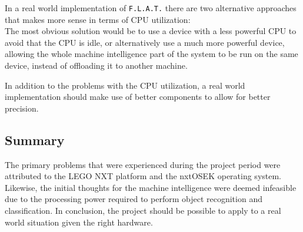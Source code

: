 In a real world implementation of \texttt{F.L.A.T.} there are two alternative approaches that makes more sense in terms of CPU utilization: \\
The most obvious solution would be to use a device with a less powerful CPU to avoid that the CPU is idle, or alternatively use a much more powerful device, allowing the whole machine intelligence part of the system to be run on the same device, instead of offloading it to another machine.

In addition to the problems with the CPU utilization, a real world implementation should make use of better components to allow for better precision.

\subsection{Summary}
The primary problems that were experienced during the project period were attributed to the LEGO NXT platform and the nxtOSEK operating system.
Likewise, the initial thoughts for the machine intelligence were deemed infeasible due to the processing power required to perform object recognition and classification. 
In conclusion, the project should be possible to apply to a real world situation given the right hardware.
